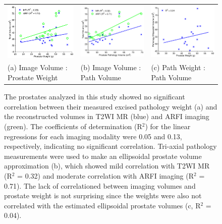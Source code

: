 \begin{figure}[htb!]
\centering
\begin{tabular}{lll}
\includegraphics[width=0.3\linewidth]{figs/corr_weight_vol} &
\includegraphics[width=0.3\linewidth]{figs/corr_pathVol_vol} &
\includegraphics[width=0.3\linewidth]{figs/corr_path_vol_weight_vol} \\
(a) Image Volume : Prostate Weight & (b) Image Volume : Path Volume & (c) Path Weight : Path Volume \\
\end{tabular}
\caption{The prostates analyzed in this study showed no significant correlation
    between their measured excised pathology weight (a) and the reconstructed
    volumes in T2WI MR (blue) and ARFI imaging (green).  The coefficients of
    determination (R$^2$) for the linear regressions for each imaging modality
    were 0.05 and 0.13, respectively, indicating no significant correlation.
    Tri-axial pathology measurements were used to make an ellipsoidal prostate
    volume approximation (b), which showed mild correlation with T2WI MR (R$^2$
    = 0.32) and moderate correlation with ARFI imaging (R$^2$ = 0.71).  The
    lack of correlationed between imaging volumes and prostate weight is not
    surprising since the weights were also not correlated with the estimated
    ellipsoidal prostate volumes (c, R$^2$ = 0.04).} 
\label{fig:mr_arfi_weight}
\end{figure}

